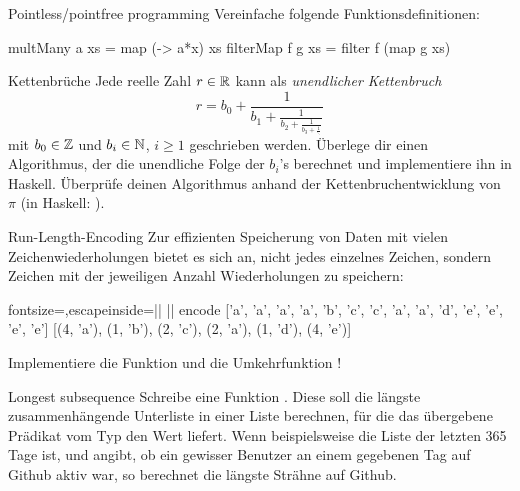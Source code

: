 \documentclass{uebblatt}
\begin{document}
\begin{aufgabe}{Pointless/pointfree programming}
  Vereinfache folgende Funktionsdefinitionen:
  \begin{haskellcode}
multMany a xs = map (\x -> a*x) xs
filterMap f g xs = filter f (map g xs)
  \end{haskellcode}
\end{aufgabe}

\begin{aufgabe}{Kettenbrüche}
  Jede reelle Zahl $r \in \mathbb{R}$ kann als \emph{unendlicher Kettenbruch}
  \[ r = b_0 + \frac{1}{b_1 + \frac{1}{b_2 + \frac{1}{b_3 + \tfrac{1}{\ddots}}}} \]
  mit $b_0 \in \mathbb{Z}$ und $b_i \in \mathbb{N}$, $i \geq 1$ geschrieben werden. Überlege dir einen Algorithmus, der die unendliche Folge der $b_i$'s berechnet und implementiere ihn in Haskell. Überprüfe deinen Algorithmus anhand der Kettenbruchentwicklung von $\pi$ (in Haskell: ).
\end{aufgabe}

\begin{aufgabe}{Run-Length-Encoding}
  Zur effizienten Speicherung von Daten mit vielen Zeichenwiederholungen bietet es sich an, nicht jedes einzelnes Zeichen, sondern Zeichen mit der jeweiligen Anzahl Wiederholungen zu speichern:
  \begin{haskellcode*}{fontsize=\footnotesize,escapeinside=||}
|\ghci| encode ['a', 'a', 'a', 'a', 'b', 'c', 'c', 'a', 'a', 'd', 'e', 'e', 'e', 'e']
[(4, 'a'), (1, 'b'), (2, 'c'), (2, 'a'), (1, 'd'), (4, 'e')]
  \end{haskellcode*}
  Implementiere die Funktion  und die Umkehrfunktion !
\end{aufgabe}

\begin{aufgabe}{Longest subsequence}
  Schreibe eine Funktion .
  Diese soll die längste zusammenhängende Unterliste in einer Liste berechnen, für die das übergebene Prädikat vom Typ  den Wert  liefert. Wenn beispielsweise  die Liste der letzten 365 Tage ist, und  angibt, ob ein gewisser Benutzer an einem gegebenen Tag auf Github aktiv war, so berechnet  die längste Strähne auf Github.
\end{aufgabe}
\end{document}
